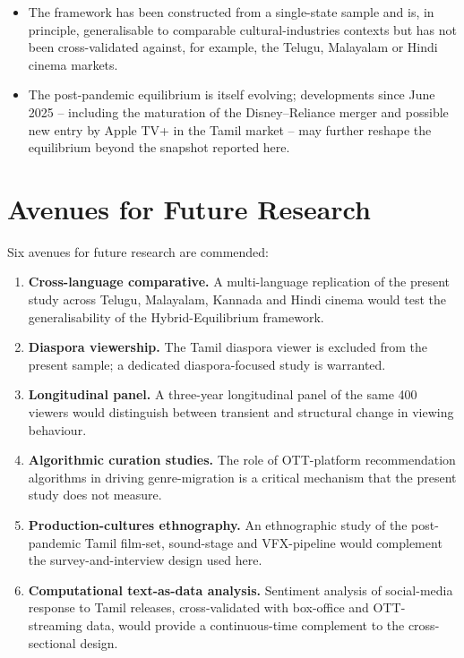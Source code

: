 \begin{itemize}[itemsep=2pt]
\item The framework has been constructed from a single-state
      sample and is, in principle, generalisable to comparable
      cultural-industries contexts but has not been
      cross-validated against, for example, the Telugu, Malayalam
      or Hindi cinema markets.
\item The post-pandemic equilibrium is itself evolving;
      developments since June 2025 -- including the maturation
      of the Disney--Reliance merger and possible new entry by
      Apple TV+ in the Tamil market -- may further reshape the
      equilibrium beyond the snapshot reported here.
\end{itemize}

\section{Avenues for Future Research}
\label{sec:future}

Six avenues for future research are commended:

\begin{enumerate}[itemsep=2pt]
\item \textbf{Cross-language comparative.}  A multi-language
      replication of the present study across Telugu, Malayalam,
      Kannada and Hindi cinema would test the generalisability
      of the Hybrid-Equilibrium framework.
\item \textbf{Diaspora viewership.}  The Tamil diaspora viewer is
      excluded from the present sample; a dedicated
      diaspora-focused study is warranted.
\item \textbf{Longitudinal panel.}  A three-year longitudinal
      panel of the same 400 viewers would distinguish between
      transient and structural change in viewing behaviour.
\item \textbf{Algorithmic curation studies.}  The role of
      OTT-platform recommendation algorithms in driving
      genre-migration is a critical mechanism that the present
      study does not measure.
\item \textbf{Production-cultures ethnography.}  An ethnographic
      study of the post-pandemic Tamil film-set, sound-stage and
      VFX-pipeline would complement the survey-and-interview
      design used here.
\item \textbf{Computational text-as-data analysis.}  Sentiment
      analysis of social-media response to Tamil releases,
      cross-validated with box-office and OTT-streaming data,
      would provide a continuous-time complement to the
      cross-sectional design.
\end{enumerate}

